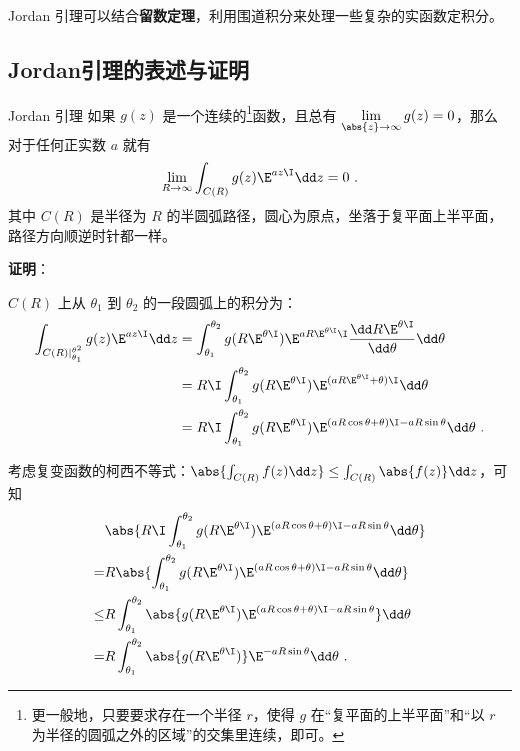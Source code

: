

Jordan 引理可以结合\textbf{留数定理}，利用围道积分来处理一些复杂的实函数定积分。

\subsection{Jordan引理的表述与证明}

\begin{theorem}{Jordan 引理}\label{the_JdLem_1}
如果 $g(z)$ 是一个连续的\footnote{更一般地，只要要求存在一个半径 $r$，使得 $g$ 在“复平面的上半平面”和“以 $r$ 为半径的圆弧之外的区域”的交集里连续，即可。}函数，且总有 $\lim\limits_{\abs{z}\to\infty}g(z)=0$，那么对于任何正实数 $a$ 就有
\begin{equation}
\lim\limits_{R\to \infty}\int_{C(R)}g(z)\E^{az\I}\dd z=0~.
\end{equation}
其中 $C(R)$ 是半径为 $R$ 的半圆弧路径，圆心为原点，坐落于复平面上半平面，路径方向顺逆时针都一样。


\end{theorem}

\textbf{证明}：

$C(R)$ 上从 $\theta_1$ 到 $\theta_2$ 的一段圆弧上的积分为：
\begin{equation}
\begin{aligned}
\int_{C(R)|_{\theta_1}^{\theta^2}}g(z)\E^{az\I}\dd z&=\int_{\theta_1}^{\theta_2}g( R\E^{\theta\I} )\E^{aR\E^{\theta\I}\I}\frac{\dd R\E^{\theta\I}}{\dd \theta}\dd\theta\\
&=R\I\int_{\theta_1}^{\theta_2}g(R\E^{\theta\I})\E^{(aR\E^{\theta\I}+\theta)\I}\dd\theta\\
&=R\I\int_{\theta_1}^{\theta_2}g(R\E^{\theta\I})\E^{(aR\cos\theta+\theta)\I-aR\sin\theta}\dd\theta~.
\end{aligned}
\end{equation}


考虑复变函数的柯西不等式：$\abs{\int_{C(R)}f(z)\dd z} \leq \int_{C(R)}\abs{f(z)}\dd z$，可知
\begin{equation}\label{eq_JdLem_4}
\begin{aligned}
&\abs{R\I\int_{\theta_1}^{\theta_2}g(R\E^{\theta\I})\E^{(aR\cos\theta+\theta)\I-aR\sin\theta}\dd\theta}\\
=&R\abs{\int_{\theta_1}^{\theta_2}g(R\E^{\theta\I})\E^{(aR\cos\theta+\theta)\I-aR\sin\theta}\dd\theta}\\
\leq&R\int_{\theta_1}^{\theta_2}\abs{g(R\E^{\theta\I})\E^{(aR\cos\theta+\theta)\I-aR\sin\theta}}\dd\theta\\
=&R\int_{\theta_1}^{\theta_2}\abs{g(R\E^{\theta\I})}\E^{-aR\sin\theta}\dd\theta~.
\end{aligned}
\end{equation}

